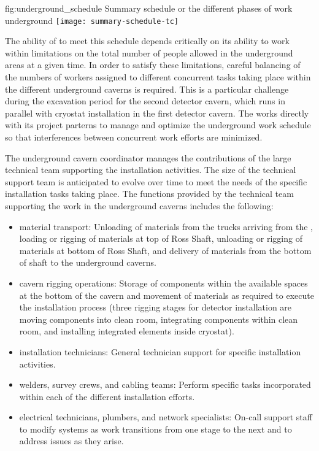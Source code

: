 \begin{dunefigure}{fig:underground_schedule}
  {Summary schedule or the different phases of work underground}
  \texttt{[image: summary-schedule-tc]}
\end{dunefigure}

The ability of  to meet this schedule depends 
critically on its ability to work within limitations on the total
number of people allowed in the underground areas at a given time.
In order to satisfy these limitations, careful balancing of the 
numbers of workers assigned to different concurrent tasks taking 
place within the different underground caverns is required.  
This is a particular challenge during the excavation period for 
the second detector cavern, which runs in parallel with cryostat
installation in the first detector cavern.  The  works 
directly with its  project parterns to manage 
and optimize the underground work schedule so that interferences 
between concurrent work efforts are minimized.

The underground cavern coordinator manages the contributions of 
the large technical team supporting the installation activities.
The size of the technical support team is anticipated to evolve  
over time to meet the needs of the specific installation tasks 
taking place.  The functions provided by the technical team 
supporting the work in the underground caverns includes the
following:

\begin{itemize}
  \item {material transport:} Unloading of materials from the 
        trucks arriving from the , loading or rigging 
        of materials at top of Ross Shaft, unloading or rigging 
        of materials at bottom of Ross Shaft, and delivery of 
        materials from the bottom of shaft to the underground 
        caverns.        
  \item {cavern rigging operations:}  Storage of 
        components within the available spaces at the bottom 
        of the cavern and movement of materials as required to 
        execute the installation process (three rigging stages
        for detector installation are moving components into 
        clean room, integrating components within clean room, 
        and installing integrated elements inside cryostat).
  \item {installation technicians:}  General technician 
        support for specific installation activities. 
  \item {welders, survey crews, and cabling teams:}  Perform 
        specific tasks incorporated within each of the different 
        installation efforts.
  \item {electrical technicians, plumbers, and network 
        specialists:}  On-call support staff to modify systems 
        as work transitions from one stage to the next and to 
        address issues as they arise.             
\end{itemize}   
    
